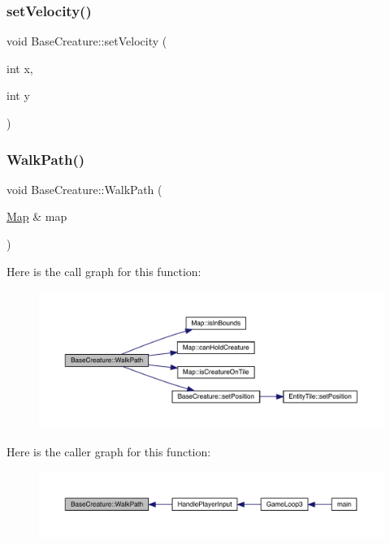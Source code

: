 \subsubsection{\texorpdfstring{set\+Velocity()}{setVelocity()}}
{\footnotesize\ttfamily void Base\+Creature\+::set\+Velocity (\begin{DoxyParamCaption}\item[{int}]{x,  }\item[{int}]{y }\end{DoxyParamCaption})}

\mbox{\label{class_base_creature_aaecab78bf5a5a5293079634e813f854f}} 
\subsubsection{\texorpdfstring{Walk\+Path()}{WalkPath()}}
{\footnotesize\ttfamily void Base\+Creature\+::\+Walk\+Path (\begin{DoxyParamCaption}\item[{\mbox{\hyperlink{class_map}{Map}} \&}]{map }\end{DoxyParamCaption})}

Here is the call graph for this function\+:
\nopagebreak
\begin{figure}[H]
\begin{center}
\leavevmode
\includegraphics[width=350pt]{class_base_creature_aaecab78bf5a5a5293079634e813f854f_cgraph}
\end{center}
\end{figure}
Here is the caller graph for this function\+:
\nopagebreak
\begin{figure}[H]
\begin{center}
\leavevmode
\includegraphics[width=350pt]{class_base_creature_aaecab78bf5a5a5293079634e813f854f_icgraph}
\end{center}
\end{figure}


